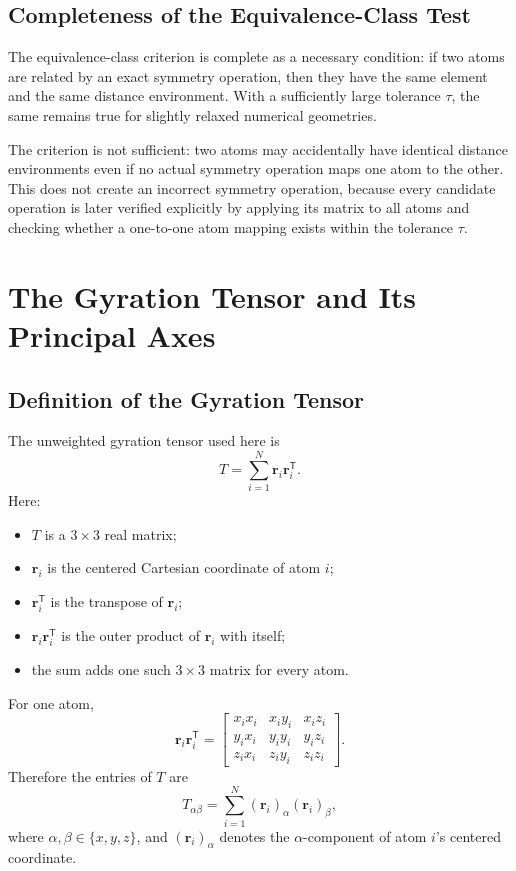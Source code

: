 \documentclass[11pt]{article}
\newcommand{\T}{\mathsf{T}}
\begin{document}
\subsection{Completeness of the Equivalence-Class Test}

The equivalence-class criterion is complete as a necessary condition: if two
atoms are related by an exact symmetry operation, then they have the same
element and the same distance environment.  With a sufficiently large tolerance
\(\tau\), the same remains true for slightly relaxed numerical geometries.

The criterion is not sufficient: two atoms may accidentally have identical
distance environments even if no actual symmetry operation maps one atom to the
other.  This does not create an incorrect symmetry operation, because every
candidate operation is later verified explicitly by applying its matrix to all
atoms and checking whether a one-to-one atom mapping exists within the tolerance
\(\tau\).

\section{The Gyration Tensor and Its Principal Axes}

\subsection{Definition of the Gyration Tensor}

The unweighted gyration tensor used here is
\[
    T = \sum_{i=1}^{N} \mathbf r_i \mathbf r_i^{\T}.
\]
Here:
\begin{itemize}
    \item \(T\) is a \(3\times 3\) real matrix;
    \item \(\mathbf r_i\) is the centered Cartesian coordinate of atom \(i\);
    \item \(\mathbf r_i^{\T}\) is the transpose of \(\mathbf r_i\);
    \item \(\mathbf r_i\mathbf r_i^{\T}\) is the outer product of
    \(\mathbf r_i\) with itself;
    \item the sum adds one such \(3\times 3\) matrix for every atom.
\end{itemize}
For one atom,
\[
    \mathbf r_i\mathbf r_i^{\T}
    =
    \begin{bmatrix}
    x_i x_i & x_i y_i & x_i z_i\\
    y_i x_i & y_i y_i & y_i z_i\\
    z_i x_i & z_i y_i & z_i z_i
    \end{bmatrix}.
\]
Therefore the entries of \(T\) are
\[
    T_{\alpha\beta}
    =
    \sum_{i=1}^{N}(\mathbf r_i)_\alpha(\mathbf r_i)_\beta,
\]
where \(\alpha,\beta\in\{x,y,z\}\), and \((\mathbf r_i)_\alpha\) denotes the
\(\alpha\)-component of atom \(i\)'s centered coordinate.
\end{document}
